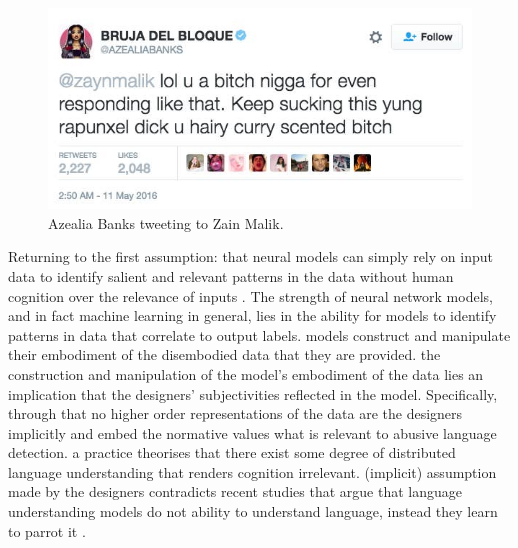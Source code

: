 \begin{figure}[h]
  \centering
  \includegraphics[scale=0.5]{Azealia_banks.jpeg}
  \caption{Azealia Banks tweeting to Zain Malik.}
  \label{fig:azealia_banks}
\end{figure}

Returning to the first assumption: that neural models can simply rely on input data to identify salient and relevant patterns in the data without human cognition over the relevance of inputs .
The strength of neural network models, and in fact machine learning in general, lies in the ability for models to identify patterns in data that correlate to output labels.
 models construct and manipulate their embodiment of the disembodied data that they are provided.
 the construction and manipulation of the model's embodiment of the data lies an implication that the designers' subjectivities  reflected in the model.
Specifically, through  that no higher order representations of the data are 
 the designers implicitly  and embed the normative values  what is relevant to abusive language detection.
 a practice  theorises that there exist some degree of distributed language understanding that renders  cognition irrelevant.
 (implicit) assumption made by the designers contradicts recent studies that argue that language understanding models do not  ability to understand language, instead they learn to parrot it \citep{Bender-Koller:2020}.

